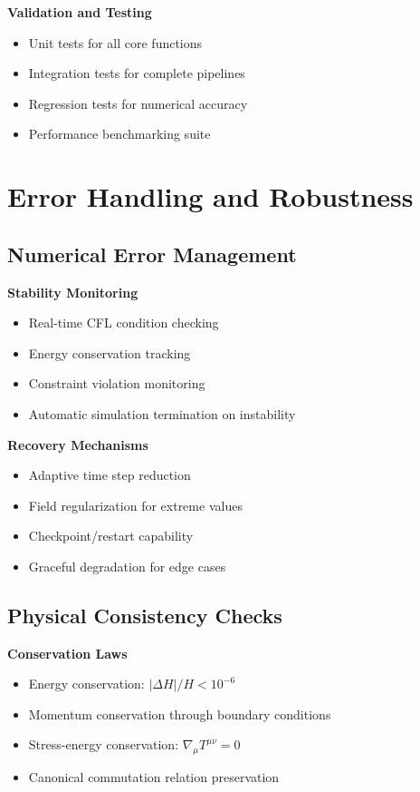 \documentclass[11pt]{article}
\begin{document}
\textbf{Validation and Testing}
\begin{itemize}
\item Unit tests for all core functions
\item Integration tests for complete pipelines
\item Regression tests for numerical accuracy
\item Performance benchmarking suite
\end{itemize}

\section{Error Handling and Robustness}

\subsection{Numerical Error Management}

\textbf{Stability Monitoring}
\begin{itemize}
\item Real-time CFL condition checking
\item Energy conservation tracking
\item Constraint violation monitoring
\item Automatic simulation termination on instability
\end{itemize}

\textbf{Recovery Mechanisms}
\begin{itemize}
\item Adaptive time step reduction
\item Field regularization for extreme values
\item Checkpoint/restart capability
\item Graceful degradation for edge cases
\end{itemize}

\subsection{Physical Consistency Checks}

\textbf{Conservation Laws}
\begin{itemize}
\item Energy conservation: $|\Delta H|/H < 10^{-6}$
\item Momentum conservation through boundary conditions
\item Stress-energy conservation: $\nabla_\mu T^{\mu\nu} = 0$
\item Canonical commutation relation preservation
\end{itemize}
\end{document}
